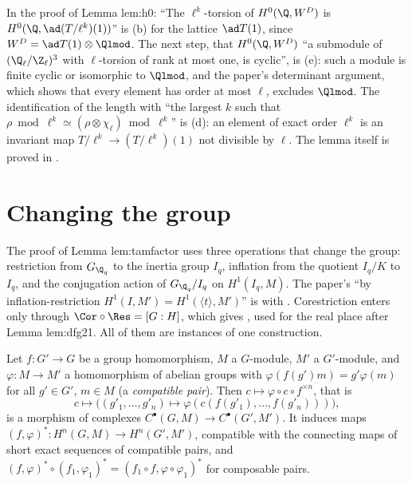 \begin{paperlink}\label{pl:cohomology:h0}
\sloppy In the proof of Lemma lem:h0: ``The $\ell^k$-torsion of $H^0(\Q,W^D)$ is $H^0(\Q,\ad(T/\ell^k)(1))$'' is (b) for the lattice
$\ad T(1)$, since $W^D=\ad T(1)\otimes\Qlmod$. The next step, that $H^0(\Q,W^D)$ ``a submodule of $(\Q_\ell/\Z_\ell)^3$ with $\ell$-torsion of rank at most one, is
cyclic'', is (e): such a module is finite cyclic or isomorphic to $\Qlmod$, and the paper's determinant argument, which shows that every element has
order at most $\ell$, excludes $\Qlmod$. The identification of the length with ``the largest $k$ such that $\rho\bmod\ell^k\simeq(\rho\otimes\chi_\ell)\bmod\ell^k$''
is (d): an element of exact order $\ell^k$ is an invariant map $T/\ell^k\to(T/\ell^k)(1)$ not divisible by $\ell$. The lemma itself is proved in .
\end{paperlink}

\section{Changing the group}\label{sec:cohomology:change}

The proof of Lemma lem:tamfactor uses three operations that change the group: restriction from $G_{\Q_q}$ to the inertia group $I_q$, inflation from
the quotient $I_q/K$ to $I_q$, and the conjugation action of $G_{\Q_q}/I_q$ on $H^1(I_q,M)$. The paper's ``by inflation-restriction
$H^1(I,M')=H^1(\langle t\rangle,M')$'' is  with . Corestriction enters only through
$\Cor\circ\Res=[G:H]$, which gives , used for the real place after Lemma lem:dfg21. All of them are instances of
one construction.

\begin{proposition}\label{prop:cohomology:compatible}
Let $f\colon G'\to G$ be a group homomorphism, $M$ a $G$-module, $M'$ a $G'$-module, and $\varphi\colon M\to M'$ a homomorphism of abelian groups with
$\varphi(f(g')m)=g'\varphi(m)$ for all $g'\in G'$, $m\in M$ (a \emph{compatible pair}). Then $c\mapsto\varphi\circ c\circ f^{\times n}$, that is
\[
c\longmapsto\bigl((g'_1,\dots,g'_n)\mapsto\varphi(c(f(g'_1),\dots,f(g'_n)))\bigr),
\]
is a morphism of complexes $C^\bullet(G,M)\to C^\bullet(G',M')$. It induces maps $(f,\varphi)^*\colon H^n(G,M)\to H^n(G',M')$, compatible with the connecting
maps of short exact sequences of compatible pairs, and $(f,\varphi)^*\circ(f_1,\varphi_1)^*=(f_1\circ f,\varphi\circ\varphi_1)^*$ for composable pairs.
\end{proposition}


